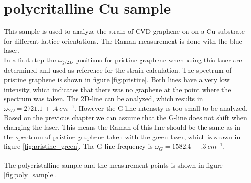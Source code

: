 \documentclass[12pt,a4paper]{article}
\begin{document}
\section{polycritalline Cu sample}
This sample is used to analyze the strain of CVD graphene on on a Cu-substrate for different lattice orientations. The Raman-measurement is done with the blue laser.\\ In a first step the $\omega_{g/2D}$ positions for pristine graphene when using this laser are determined and used as reference for the strain calculation. The spectrum of pristine graphene is shown in figure \ref{fig:pristine}. Both lines have a very low intensity, which indicates that there was no graphene at the point where the spectrum was taken. The 2D-line can be analyzed, which results in  $\omega_{2D} = \SI{2721.1(4)}{cm^{-1}}$. However the G-line intensity is too small to be analyzed. Based on the previous chapter we can assume that the G-line does not shift when changing the laser. This means the Raman of this line should be the same as in the spectrum of pristine graphene taken with the green laser, which is shown in figure \ref{fig:pristine_green}. The G-line frequency is $\omega_{G} = \SI{1582.4(3)}{cm^{-1}}$.\\
\\
The polycristalline sample and the measurement points is shown in figure  \ref{fig:poly_sample}. 
\end{document}
